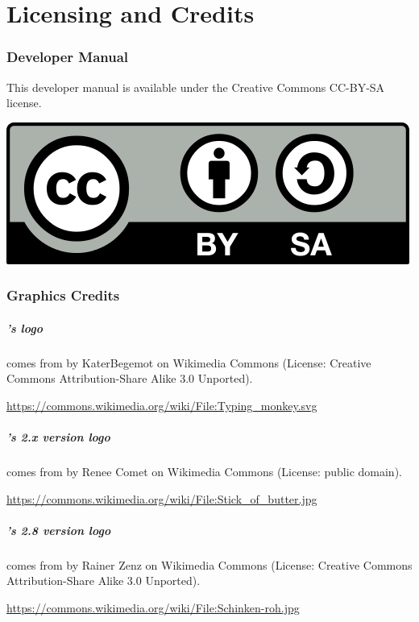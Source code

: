 \chapter{Licensing and Credits}


\subsection*{Developer Manual}
This developer manual is available under the Creative Commons CC-BY-SA license.

\begin{center}
	\includegraphics[width=.2\textwidth]{images/CC-BY-SA_500.png}
\end{center}

\bigskip

\subsection*{Graphics Credits}

\paragraph{\imitator{}'s logo} comes from  by KaterBegemot on Wikimedia Commons
	(License: Creative Commons Attribution-Share Alike 3.0 Unported).

\url{https://commons.wikimedia.org/wiki/File:Typing_monkey.svg}


\paragraph{\imitator{}'s 2.x version logo} comes from  by Renee Comet on Wikimedia Commons
	(License: public domain).

\url{https://commons.wikimedia.org/wiki/File:Stick_of_butter.jpg}


\paragraph{\imitator{}'s 2.8 version logo} comes from  by Rainer Zenz on Wikimedia Commons
	(License: Creative Commons Attribution-Share Alike 3.0 Unported).

\url{https://commons.wikimedia.org/wiki/File:Schinken-roh.jpg}


\newpage







